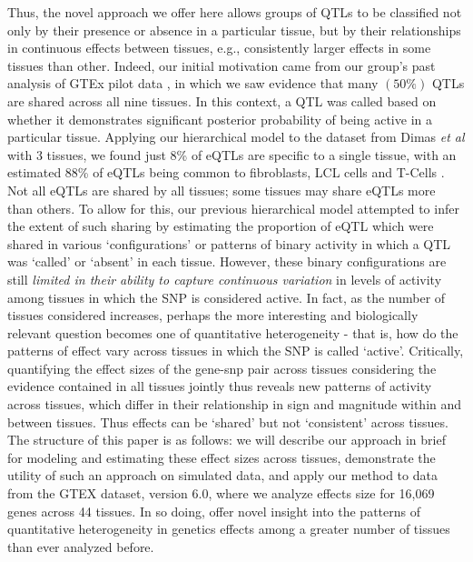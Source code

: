 Thus, the novel approach we offer here allows groups of QTLs to be classified not only by their presence or absence in a particular tissue, but by their relationships in continuous effects between tissues, e.g., consistently larger effects in some tissues than other.
 Indeed, our initial motivation came from our group's past analysis of GTEx pilot data \cite{consortium_genotype-tissue_2015}, in which we saw evidence that many $(50\%)$ QTLs are shared across all nine tissues. In this context, a QTL was called based on whether it demonstrates significant posterior probability of being active in a particular tissue. Applying our hierarchical model to the dataset from Dimas {\it et al} \cite{dimas_common_2009} with 3 tissues, we found just 8\% of eQTLs are specific to a single tissue, with an estimated 88\% of eQTLs being common to fibroblasts, LCL cells and T-Cells \cite{flutre_statistical_2013}. Not all eQTLs are shared by all tissues; some tissues may share eQTLs more than others. To allow for this, our previous hierarchical model attempted to infer the extent of such sharing by estimating the proportion of eQTL which were shared in various `configurations' or patterns of binary activity in which a QTL was `called' or `absent' in each tissue.
 However, these binary configurations are still \textit{limited in their ability to capture continuous variation} in levels of activity among tissues in which the SNP is considered active. 
 In fact, as the number of tissues considered increases, perhaps the more interesting and biologically relevant question becomes one of quantitative heterogeneity - that is, how do the patterns of effect vary across tissues in which the SNP is called `active'.  
Critically, quantifying the effect sizes of the gene-snp pair across tissues considering the evidence contained in all tissues jointly thus reveals new patterns of activity across tissues, which differ in their relationship in sign and magnitude within and between tissues. Thus effects can be `shared' but not `consistent' across tissues. The structure of this paper is as follows: we will describe our approach in brief for modeling and estimating these effect sizes across tissues, demonstrate the utility of such an approach on simulated data, and apply our method to data from the GTEX dataset, version 6.0, where we analyze effects size for 16,069 genes across 44 tissues. In so doing, offer novel insight into the patterns of quantitative heterogeneity in genetics effects among a greater number of tissues than ever analyzed before.
